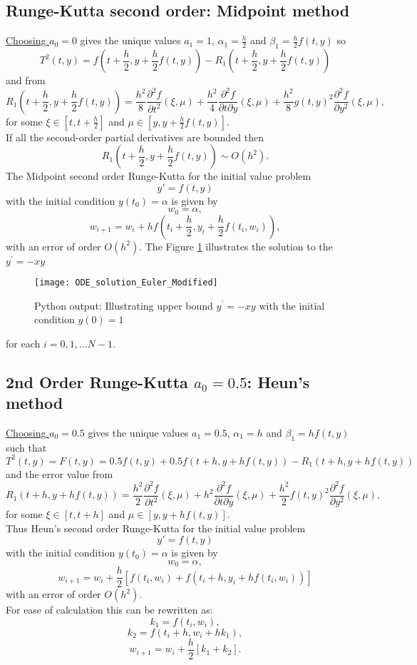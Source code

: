 \subsection{Runge-Kutta second order: Midpoint method}
\underline{Choosing $a_0=0$} gives the unique values $a_1=1$, $\alpha_1=\frac{h}{2}$ and $\beta_1=\frac{h}{2}f(t,y)$
so
\[T^{2}(t,y) = f(t+\frac{h}{2},y+\frac{h}{2}f(t,y))-R_1(t+\frac{h}{2},y+\frac{h}{2}f(t,y))
\]
and from
\[ R_1(t+\frac{h}{2},y+\frac{h}{2}f(t,y))=\frac{h^2}{8}\frac{\partial^2 f}{\partial t ^2}(\xi,\mu)
+\frac{h^2}{4} \frac{\partial^2 f}{\partial t \partial y}(\xi,\mu)
+\frac{h^2}{8}g(t,y)^2\frac{\partial^2 f}{\partial y^2} (\xi,\mu),
\]for some $\xi \in [t,t+\frac{h}{2}]$ and $\mu \in [y,y+\frac{h}{2}f(t,y)]$.\\
If all the second-order partial derivatives are bounded then
\[ R_1(t+\frac{h}{2},y+\frac{h}{2}f(t,y)) \sim O(h^2). \]
The Midpoint second order Runge-Kutta for the initial value problem
\[y'=f(t,y)\] 
with the initial condition $y(t_0)=\alpha$ is given by
\[w_0=\alpha, \]
\[w_{i+1}=w_i+hf(t_i+\frac{h}{2},y_i+\frac{h}{2}f(t_i,w_i)), \]
with an error of order $O(h^2)$.
The Figure \ref{Modified Euler Figure} illustrates the solution to the  $y^{'}=-xy$
\begin{figure}[H]
\centering
\texttt{[image: ODE\_solution\_Euler\_Modified]}
\caption{Python output: Illustrating upper bound $y^{'}=-xy$ with the initial condition $y(0)=1$ }
\label{Modified Euler Figure}
\end{figure}
for each $i=0,1,...N-1.$

\subsection{2nd Order Runge-Kutta $a_0=0.5$: Heun's method}
\underline{Choosing $a_0=0.5$} gives the unique values $a_1=0.5$, $\alpha_1=h$ and $\beta_1=hf(t,y)$
such that 
\[T^{2}(t,y)=F(t,y) = 0.5 f(t,y)+0.5 f(t+h,y+hf(t,y))-R_1(t+h,y+hf(t,y))
\]
and the error value from
\[ R_1(t+h,y+hf(t,y))=\frac{h^2}{2}\frac{\partial^2 f}{\partial t ^2}(\xi,\mu)
+h^2 \frac{\partial^2 f}{\partial t \partial y}(\xi,\mu)
+\frac{h^2}{2}f(t,y)^2\frac{\partial^2 f}{\partial y^2} (\xi,\mu),
\]for some $\xi \in [t,t+h]$ and $\mu \in [y,y+hf(t,y)]$.\\

Thus Heun's second order Runge-Kutta for the initial value problem
\[y'=f(t,y)\] 
with the initial condition $y(t_0)=\alpha$ is given by
\[w_0=\alpha, \]
\[w_{i+1}=w_i+\frac{h}{2}[f(t_i,w_i)+f(t_i+h,y_i+hf(t_i,w_i))] \]
with an error of order $O(h^2)$.\\
For ease of calculation this can be rewritten as:
\[k_1=f(t_i,w_i),\]
\[k_2=f(t_i+h,w_i+hk_1),\]
\[w_{i+1}=w_i+\frac{h}{2}[k_1+k_2]. \]

